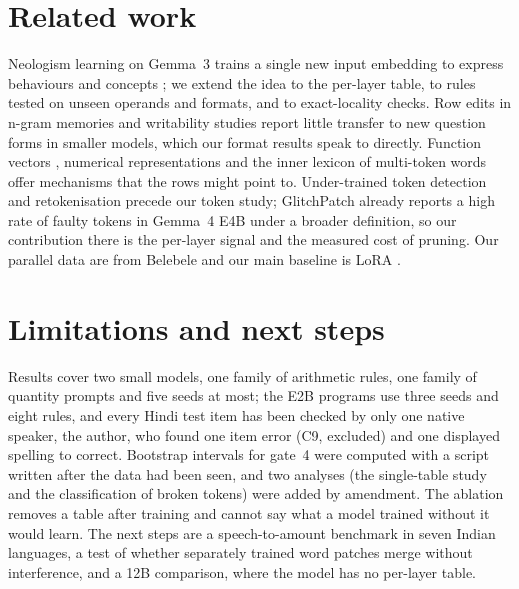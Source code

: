 \documentclass[10pt]{article}
\begin{document}
\section{Related work}
Neologism learning on Gemma~3 trains a single new input embedding to express behaviours and concepts \citep{hewitt}; we extend the idea to the per-layer table, to rules tested on unseen operands and formats, and to exact-locality checks. Row edits in n-gram memories and writability studies \citep{engram,writability} report little transfer to new question forms in smaller models, which our format results speak to directly. Function vectors \citep{fv}, numerical representations \citep{helix} and the inner lexicon of multi-token words \citep{lexicon} offer mechanisms that the rows might point to. Under-trained token detection \citep{magikarp} and retokenisation \citep{glitchpatch} precede our token study; GlitchPatch already reports a high rate of faulty tokens in Gemma~4 E4B under a broader definition, so our contribution there is the per-layer signal and the measured cost of pruning. Our parallel data are from Belebele \citep{belebele} and our main baseline is LoRA \citep{lora}.

\section{Limitations and next steps}
Results cover two small models, one family of arithmetic rules, one family of quantity prompts and five seeds at most; the E2B programs use three seeds and eight rules, and every Hindi test item has been checked by only one native speaker, the author, who found one item error (C9, excluded) and one displayed spelling to correct. Bootstrap intervals for gate~4 were computed with a script written after the data had been seen, and two analyses (the single-table study and the classification of broken tokens) were added by amendment. The ablation removes a table after training and cannot say what a model trained without it would learn. The next steps are a speech-to-amount benchmark in seven Indian languages, a test of whether separately trained word patches merge without interference, and a 12B comparison, where the model has no per-layer table.
\end{document}
